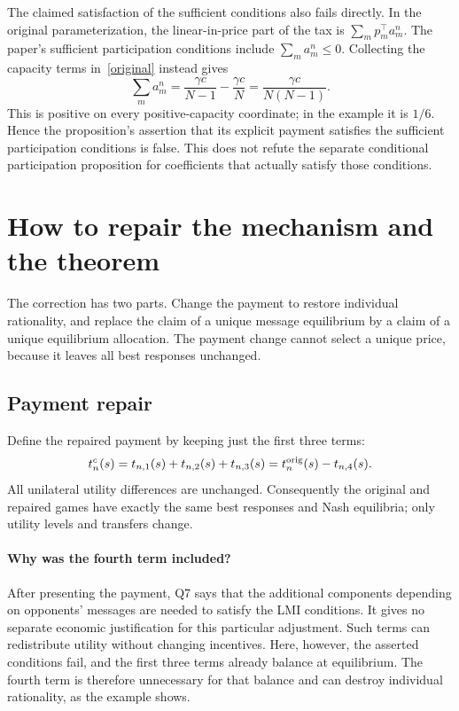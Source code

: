 \documentclass[11pt]{article}
\begin{document}
The claimed satisfaction of the sufficient conditions also fails
directly. In the original parameterization, the linear-in-price
part of the tax is $\sum_m p_m^\top a_m^n$. The paper's sufficient
participation conditions include $\sum_m a_m^n\le0$.
Collecting the capacity terms in~\eqref{original} instead gives
\[
 \sum_m a_m^n
 =\frac{\gamma c}{N-1}-\frac{\gamma c}{N}
 =\frac{\gamma c}{N(N-1)}.
\]
This is positive on every positive-capacity coordinate; in the example
it is $1/6$. Hence the proposition's assertion that its explicit
payment satisfies the sufficient participation conditions is false.
This does not refute the separate conditional participation proposition
for coefficients that actually satisfy those conditions.

\section{How to repair the mechanism and the theorem}
The correction has two parts. Change the payment to restore individual
rationality, and replace the claim of a unique message equilibrium by a
claim of a unique equilibrium allocation. The payment change cannot
select a unique price, because it leaves all best responses unchanged.

\subsection{Payment repair}
Define the repaired payment by keeping just the first three terms:
\begin{equation}\label{repair}
 t_n^c(s)=t_{n,1}(s)+t_{n,2}(s)+t_{n,3}(s)
 =t_n^{\rm orig}(s)-t_{n,4}(s).
\end{equation}
All unilateral utility differences are unchanged. Consequently the
original and repaired games have exactly the same best responses and
Nash equilibria; only utility levels and transfers change.

\paragraph{Why was the fourth term included?}
After presenting the payment, Q7 says that the additional components
depending on opponents' messages are needed to satisfy the LMI conditions.
It gives no separate economic justification for this particular adjustment.
Such terms can redistribute utility without changing incentives. Here,
however, the asserted conditions fail, and the first three terms already
balance at equilibrium. The fourth term is therefore unnecessary for
that balance and can destroy individual rationality, as the example shows.
\end{document}
